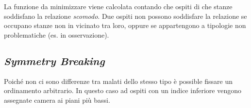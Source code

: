 \noindent
La funzione da minimizzare viene calcolata contando che ospiti di che stanze soddisfano la relazione \emph{scomodo}.
Due ospiti non possono soddisfare la relazione se occupano stanze non in vicinato tra loro, oppure se appartengono a tipologie non problematiche (es. in osservazione).


\subsection{\emph{Symmetry Breaking}}
Poiché non ci sono differenze tra malati dello stesso tipo è possible fissare un ordinamento arbitrario.
In questo caso ad ospiti con un indice inferiore vengono assegnate camera ai piani più bassi.


\noindent
{}




